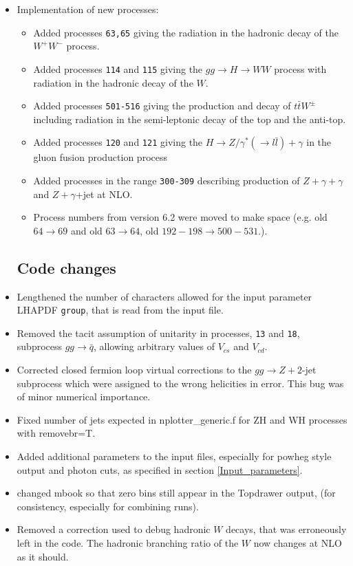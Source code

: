 \documentclass[12pt]{article}
\begin{document}
\begin{itemize}
\item Implementation of new processes:
\begin{itemize}
\item
Added processes {\tt 63,65} giving the radiation in the hadronic decay of the $W^+W^-$ process. 
\item 
Added processes {\tt 114} and {\tt 115} giving the $gg\to H\to WW$ process with radiation in the hadronic decay of the $W$.
\item 
Added processes {\tt 501-516} giving the production and decay of 
$t \bar{t} W^\pm$ including radiation in the semi-leptonic decay of the top and the anti-top.
\item 
Added processes {\tt 120} and {\tt 121} giving the $H\to Z/\gamma^*(\to l \bar{l})+\gamma$ 
in the gluon fusion production process
\item 
Added processes in the range {\tt 300-309} describing production of $Z+\gamma+\gamma$ 
and $Z+\gamma$+jet at NLO.
\item
Process numbers from version 6.2 were moved to make space 
(e.g. old $64 \to 69$ and old $63\to 64$, old $192-198 \to 500-531$.). 
\end{itemize}
\subsection{Code changes}
\item Lengthened the number of characters allowed for the input parameter LHAPDF {\tt group}, 
that is read from the input file.
\item Removed the tacit assumption of unitarity in processes, {\tt 13} and {\tt 18}, 
subprocess $gg \to \bar{q}$, 
allowing arbitrary values of $V_{cs}$ and $V_{cd}$.  
\item 
Corrected closed fermion loop virtual corrections to the $gg \to Z+2$-jet subprocess which were assigned to the wrong 
helicities in error. This bug was of minor numerical importance. 
\item
Fixed number of jets expected in nplotter\_generic.f for ZH and WH processes with removebr=T.
\item
Added additional parameters to the input files, 
especially for powheg style output and photon cuts, as specified in section \ref{Input_parameters}.
\item 
changed mbook so that zero bins still appear in the Topdrawer output,
(for consistency, especially for combining runs).
\item
Removed a correction used to debug hadronic $W$ decays, that was erroneously left in the code.
The hadronic branching ratio of the $W$ now changes at NLO as it should.


\end{itemize}
\end{document}
